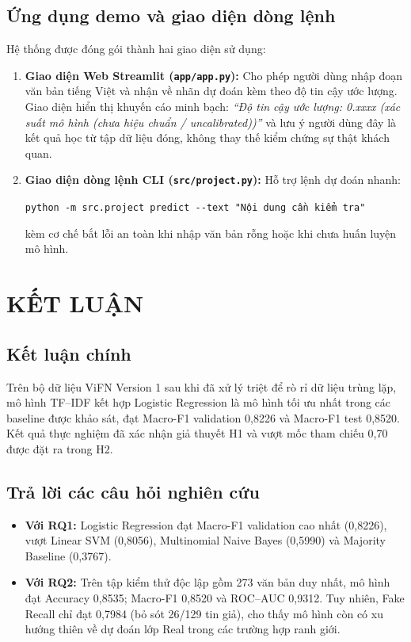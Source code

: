 \documentclass[12pt,a4paper]{report}
\begin{document}
\section{Ứng dụng demo và giao diện dòng lệnh}
Hệ thống được đóng gói thành hai giao diện sử dụng:
\begin{enumerate}[leftmargin=24pt]
  \item \textbf{Giao diện Web Streamlit (\texttt{app/app.py}):} Cho phép người dùng nhập đoạn văn bản tiếng Việt và nhận về nhãn dự đoán kèm theo độ tin cậy ước lượng. Giao diện hiển thị khuyến cáo minh bạch: \textit{``Độ tin cậy ước lượng: 0.xxxx (xác suất mô hình (chưa hiệu chuẩn / uncalibrated))''} và lưu ý người dùng đây là kết quả học từ tập dữ liệu đóng, không thay thế kiểm chứng sự thật khách quan.
  \item \textbf{Giao diện dòng lệnh CLI (\texttt{src/project.py}):} Hỗ trợ lệnh dự đoán nhanh:
  \begin{center}
    \texttt{python -m src.project predict -{}-text "Nội dung cần kiểm tra"}
  \end{center}
  kèm cơ chế bắt lỗi an toàn khi nhập văn bản rỗng hoặc khi chưa huấn luyện mô hình.
\end{enumerate}

\chapter{KẾT LUẬN}

\section{Kết luận chính}
Trên bộ dữ liệu ViFN Version 1 sau khi đã xử lý triệt để rò rỉ dữ liệu trùng lặp, mô hình TF--IDF kết hợp Logistic Regression là mô hình tối ưu nhất trong các baseline được khảo sát, đạt Macro-F1 validation 0,8226 và Macro-F1 test 0,8520. Kết quả thực nghiệm đã xác nhận giả thuyết H1 và vượt mốc tham chiếu 0,70 được đặt ra trong H2.

\section{Trả lời các câu hỏi nghiên cứu}
\begin{itemize}[leftmargin=24pt]
  \item \textbf{Với RQ1:} Logistic Regression đạt Macro-F1 validation cao nhất (0,8226), vượt Linear SVM (0,8056), Multinomial Naive Bayes (0,5990) và Majority Baseline (0,3767).
  \item \textbf{Với RQ2:} Trên tập kiểm thử độc lập gồm 273 văn bản duy nhất, mô hình đạt Accuracy 0,8535; Macro-F1 0,8520 và ROC--AUC 0,9312. Tuy nhiên, Fake Recall chỉ đạt 0,7984 (bỏ sót 26/129 tin giả), cho thấy mô hình còn có xu hướng thiên về dự đoán lớp Real trong các trường hợp ranh giới.
\end{itemize}
\end{document}
